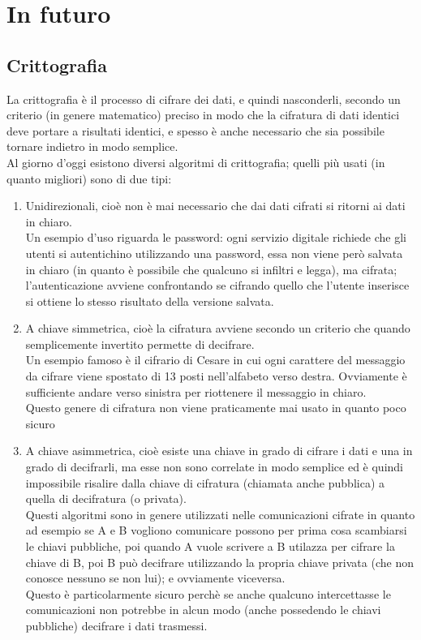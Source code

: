 \section{In futuro}
\subsection{Crittografia}
La crittografia è il processo di cifrare dei dati, e quindi nasconderli, secondo un criterio (in genere matematico) preciso in modo che la cifratura di dati identici deve portare a risultati identici, e spesso è anche necessario che sia possibile tornare indietro in modo semplice.\\
Al giorno d'oggi esistono diversi algoritmi di crittografia; quelli più usati (in quanto migliori) sono di due tipi:
\begin{enumerate}
\item Unidirezionali, cioè non è mai necessario che dai dati cifrati si ritorni ai dati in chiaro.\\
Un esempio d'uso riguarda le password: ogni servizio digitale richiede che gli utenti si autentichino utilizzando una password, essa non viene però salvata in chiaro (in quanto è possibile che qualcuno si infiltri e legga), ma cifrata; l'autenticazione avviene confrontando se cifrando quello che l'utente inserisce si ottiene lo stesso risultato della versione salvata.
\item A chiave simmetrica, cioè la cifratura avviene secondo un criterio che quando semplicemente invertito permette di decifrare.\\
Un esempio famoso è il cifrario di Cesare in cui ogni carattere del messaggio da cifrare viene spostato di 13 posti nell'alfabeto verso destra. Ovviamente è sufficiente andare verso sinistra per riottenere il messaggio in chiaro.\\
Questo genere di cifratura non viene praticamente mai usato in quanto poco sicuro
\item A chiave asimmetrica, cioè esiste una chiave in grado di cifrare i dati e una in grado di decifrarli, ma esse non sono correlate in modo semplice ed è quindi impossibile risalire dalla chiave di cifratura (chiamata anche pubblica) a quella di decifratura (o privata).\\
Questi algoritmi sono in genere utilizzati nelle comunicazioni cifrate in quanto ad esempio se A e B vogliono comunicare possono per prima cosa scambiarsi le chiavi pubbliche, poi quando A vuole scrivere a B utilazza per cifrare la chiave di B, poi B può decifrare utilizzando la propria chiave privata (che non conosce nessuno se non lui); e ovviamente viceversa.\\
Questo è particolarmente sicuro perchè se anche qualcuno intercettasse le comunicazioni non potrebbe in alcun modo (anche possedendo le chiavi pubbliche) decifrare i dati trasmessi.
\end{enumerate}
